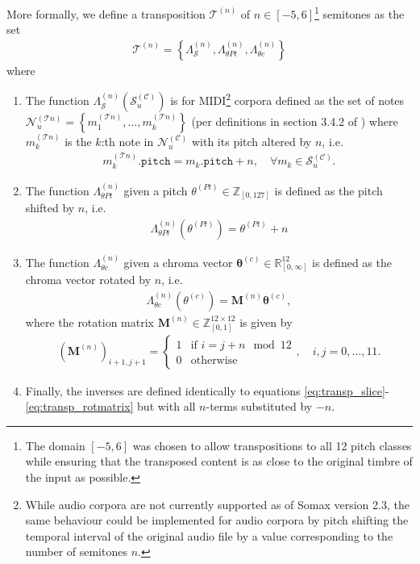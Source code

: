 More formally, we define a transposition $\mathcal T^{(n)}$ of $n \in [-5, 6]$\footnote{The domain $[-5,6]$ was chosen to allow transpositions to all 12 pitch classes while ensuring that the transposed content is as close to the original timbre of the input as possible.} semitones as the set \begin{align}
		\mathcal T^{(n)} = \left\lbrace  
			\Lambda_{\mathcal S}^{(n)}, \Lambda_{\theta Pt}^{(n)}, \Lambda_{\theta c}^{(n)}\right\rbrace
 	\end{align}
 	where
 	\begin{enumerate}
 		\item [(i)] The function $\Lambda^{(n)}_{\mathcal S}\left(\mathcal S^{(\mathcal C)}_u\right)$ is for MIDI\footnote{While audio corpora are not currently supported as of Somax version 2.3, the same behaviour could be implemented for audio corpora by pitch shifting the temporal interval of the original audio file by a value corresponding to the number of semitones $n$. }  corpora defined as the set of notes $\mathcal N^{(\mathcal Tn)}_u = \left\lbrace m_1^{(\mathcal Tn)}, \dots , m_k^{(\mathcal Tn)}\right\rbrace$ (per definitions in section 3.4.2 of \cite{borg2020dynamic}) where $m_k^{(\mathcal Tn)}$ is the $k$:th note in $\mathcal N^{(\mathcal C)}_u$ with its pitch altered by $n$, i.e.
 			\begin{align}\label{eq:transp_slice}
				m_k^{(\mathcal Tn)}\texttt{.pitch} = m_k\texttt{.pitch} + n, \quad \forall m_k \in \mathcal S^{(\mathcal C)}_u.
			\end{align}
		\item [(ii.1)] The function $\Lambda^{(n)}_{\theta Pt}$ given a pitch $\theta^{(Pt)} \in \mathbb Z_{[0, 127]}$ is defined as the pitch shifted by $n$, i.e.
			\begin{align}\label{eq:transp_pitch}
				\Lambda^{(n)}_{\theta Pt}\left(\theta^{(Pt)}\right) = \theta^{(Pt)} + n
			\end{align}
		\item [(ii.2)] The function $\Lambda^{(n)}_{\theta c}$ given a chroma vector $\bm{\theta}^{(c)} \in \mathbb R^{12}_{[0, \infty]}$ is defined as the chroma vector rotated by $n$, i.e.
			\begin{align}\label{eq:transp_chroma}
				\Lambda^{(n)}_{\theta c}\left(\theta^{(c)}\right) = \mathbf M^{(n)} \bm{\theta}^{(c)},
			\end{align}
			where the rotation matrix $\bm M^{(n)} \in \mathbb Z^{12\times 12}_{[0,1]}$ is given by
			\begin{align}\label{eq:transp_rotmatrix}
				\left(\mathbf M^{(n)}\right)_{i+1,j+1} 
				= \left\lbrace \begin{array}{ll}
 					1 & \text{if } i = j + n \mod{12}\\
 					0 & \text{otherwise}
 				\end{array}\right., \quad i,j = 0,\dots,11.
			\end{align}
		\item [(iii)] Finally, the inverses are defined identically to equations \ref{eq:transp_slice}-\ref{eq:transp_rotmatrix} but with all $n$-terms substituted by $-n$.
 	\end{enumerate}

